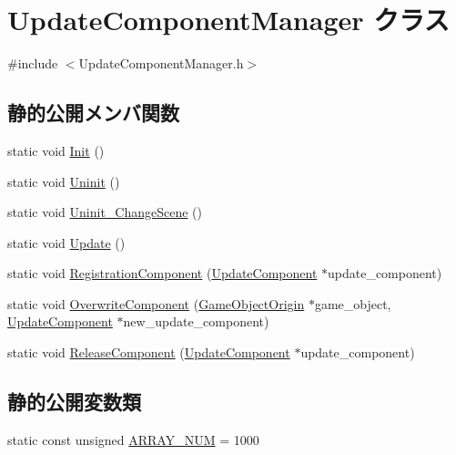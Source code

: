 \hypertarget{class_update_component_manager}{}\section{Update\+Component\+Manager クラス}
\label{class_update_component_manager}


{\ttfamily \#include $<$Update\+Component\+Manager.\+h$>$}

\subsection*{静的公開メンバ関数}
\begin{DoxyCompactItemize}
\item 
static void \mbox{\hyperlink{class_update_component_manager_aa11488edc20a2585c88f03de685cd789}{Init}} ()
\item 
static void \mbox{\hyperlink{class_update_component_manager_acbe5805345fb49ab4c55a36335ea8ed0}{Uninit}} ()
\item 
static void \mbox{\hyperlink{class_update_component_manager_af9a06938446de73e77f35df559aac3ca}{Uninit\+\_\+\+Change\+Scene}} ()
\item 
static void \mbox{\hyperlink{class_update_component_manager_a9d44f1549f16388dec1985a8fe3c40ac}{Update}} ()
\item 
static void \mbox{\hyperlink{class_update_component_manager_afda03f7d2347c24e1bbb5f499dfaf1b4}{Registration\+Component}} (\mbox{\hyperlink{class_update_component}{Update\+Component}} $\ast$update\+\_\+component)
\item 
static void \mbox{\hyperlink{class_update_component_manager_ab388716e00fb593958b1c3d305aff5da}{Overwrite\+Component}} (\mbox{\hyperlink{class_game_object_origin}{Game\+Object\+Origin}} $\ast$game\+\_\+object, \mbox{\hyperlink{class_update_component}{Update\+Component}} $\ast$new\+\_\+update\+\_\+component)
\item 
static void \mbox{\hyperlink{class_update_component_manager_acc51d246bbe2d5c05c90fd377ec655ef}{Release\+Component}} (\mbox{\hyperlink{class_update_component}{Update\+Component}} $\ast$update\+\_\+component)
\end{DoxyCompactItemize}
\subsection*{静的公開変数類}
\begin{DoxyCompactItemize}
\item 
static const unsigned \mbox{\hyperlink{class_update_component_manager_ab4f602a8458830db8955266327c3694f}{A\+R\+R\+A\+Y\+\_\+\+N\+UM}} = 1000
\end{DoxyCompactItemize}


